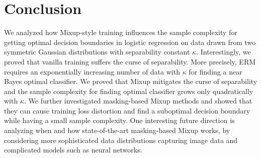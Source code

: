 \section{Conclusion}
We analyzed how Mixup-style training influences the sample complexity for getting optimal decision boundaries in logistic regression on data drawn from two symmetric Gaussian distributions with separability constant $\kappa$. Interestingly, we proved that vanilla training suffers the curse of separability. More precisely, ERM requires an exponentially increasing number of data with $\kappa$ for finding a near Bayes optimal classifier. We proved that Mixup mitigates the curse of separability and the sample complexity for finding optimal classifier grows only quadratically with $\kappa$. We further investigated masking-based Mixup methods and showed that they can cause training loss distortion and find a suboptimal decision boundary while having a small sample complexity. One interesting future direction is analyzing when and how state-of-the-art masking-based Mixup works, by considering more sophisticated data distributions capturing image data and complicated models such as neural networks.